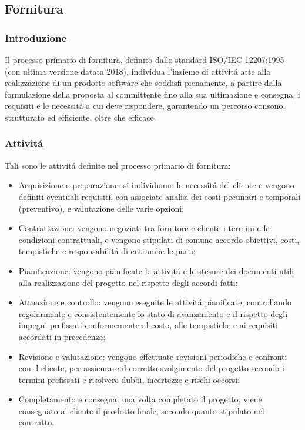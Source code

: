 
\subsection{Fornitura}
\subsubsection{Introduzione}
Il processo primario di fornitura, definito dallo standard ISO/IEC 12207:1995 (con ultima versione datata 2018), individua l'insieme di attivitá atte alla realizzazione di un prodotto software che soddisfi pienamente, a partire dalla formulazione della proposta al committente fino alla sua ultimazione e consegna, i requisiti e le necessitá a cui deve rispondere, garantendo un percorso consono, strutturato ed efficiente, oltre che efficace.

\subsubsection{Attivitá}
Tali sono le attivitá definite nel processo primario di fornitura:

\begin{itemize}
    \item Acquisizione e preparazione: si individuano le necessitá del cliente e vengono definiti eventuali requisiti, con associate analisi dei costi pecuniari e temporali (preventivo), e valutazione delle varie opzioni;
    \item Contrattazione: vengono negoziati tra fornitore e cliente i termini e le condizioni contrattuali, e vengono stipulati di comune accordo obiettivi, costi, tempistiche e responsabilitá di entrambe le parti;
    \item Pianificazione: vengono pianificate le attivitá e le stesure dei documenti utili alla realizzazione del progetto nel rispetto degli accordi fatti;
    \item Attuazione e controllo: vengono eseguite le attivitá pianificate, controllando regolarmente e consistentemente lo stato di avanzamento e il rispetto degli impegni prefissati conformemente al costo, alle tempistiche e ai requisiti accordati in precedenza;
    \item Revisione e valutazione: vengono effettuate revisioni periodiche e confronti con il cliente, per assicurare il corretto svolgimento del progetto secondo i termini prefissati e risolvere dubbi, incertezze e rischi occorsi;
    \item Completamento e consegna: una volta completato il progetto, viene consegnato al cliente il prodotto finale, secondo quanto stipulato nel contratto.
\end{itemize}

